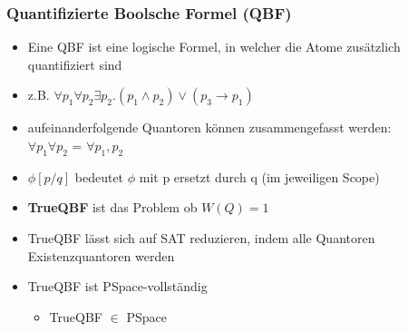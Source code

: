 \documentclass[12pt,a4paper]{article}
\begin{document}
\subsubsection{Quantifizierte Boolsche Formel (QBF)}
\begin{itemize}
\item Eine QBF ist eine logische Formel, in welcher die Atome zusätzlich quantifiziert sind
\item z.B. $\forall p_1 \forall p_2 \exists p_2. (p_1 \land p_2) \lor (p_3 \rightarrow p_1)$
\item aufeinanderfolgende Quantoren können zusammengefasst werden:\\
$\forall p_1 \forall p_2$ = $\forall p_1, p_2$
\item $\phi [p/q]$ bedeutet $\phi$ mit p ersetzt durch q (im jeweiligen Scope)
\item \textbf{TrueQBF} ist das Problem ob $W(Q) = 1$
\item TrueQBF lässt sich auf SAT reduzieren, indem alle Quantoren Existenzquantoren werden
\item TrueQBF ist PSpace-vollständig
\begin{itemize}
\item TrueQBF $\in$ PSpace


\end{itemize}
\end{itemize}
\end{document}
